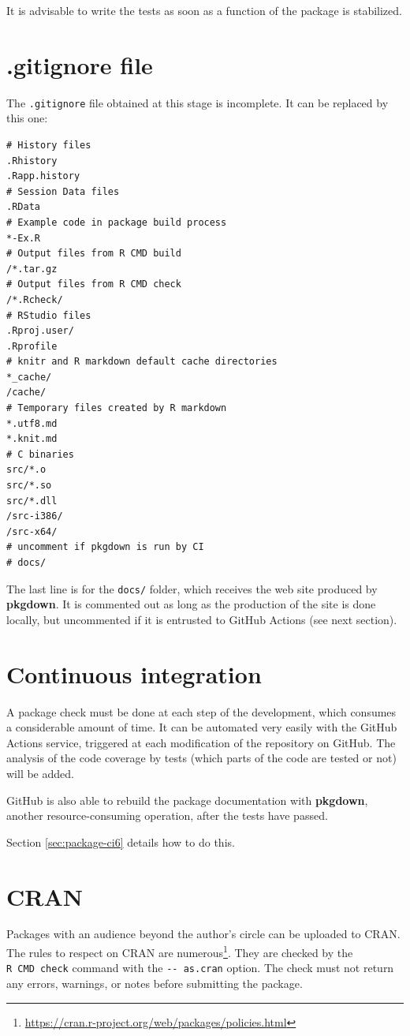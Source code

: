 \documentclass[
  12pt,
  american,
  a4paper,
  extrafontsizes,onecolumn,openright
  ]{memoir}
\begin{document}
It is advisable to write the tests as soon as a function of the package is stabilized.

\section{.gitignore file}\label{gitignore-file}

The \texttt{.gitignore} file obtained at this stage is incomplete.
It can be replaced by this one:

\begin{verbatim}
# History files
.Rhistory
.Rapp.history
# Session Data files
.RData
# Example code in package build process
*-Ex.R
# Output files from R CMD build
/*.tar.gz
# Output files from R CMD check
/*.Rcheck/
# RStudio files
.Rproj.user/
.Rprofile
# knitr and R markdown default cache directories
*_cache/
/cache/
# Temporary files created by R markdown
*.utf8.md
*.knit.md
# C binaries
src/*.o
src/*.so
src/*.dll
/src-i386/
/src-x64/
# uncomment if pkgdown is run by CI
# docs/
\end{verbatim}

The last line is for the \texttt{docs/} folder, which receives the web site produced by \textbf{pkgdown}.
It is commented out as long as the production of the site is done locally, but uncommented if it is entrusted to GitHub Actions (see next section).

\section{Continuous integration}\label{sec:package-ci5}

A package check must be done at each step of the development, which consumes a considerable amount of time.
It can be automated very easily with the GitHub Actions service, triggered at each modification of the repository on GitHub.
The analysis of the code coverage by tests (which parts of the code are tested or not) will be added.

GitHub is also able to rebuild the package documentation with \textbf{pkgdown}, another resource-consuming operation, after the tests have passed.

Section \ref{sec:package-ci6} details how to do this.

\section{CRAN}\label{sec:package-cran}

Packages with an audience beyond the author's circle can be uploaded to CRAN.
The rules to respect on CRAN are numerous\footnote{\url{https://cran.r-project.org/web/packages/policies.html}}. They are checked by the \texttt{R\ CMD\ check} command with the \texttt{-\/-\ as.cran} option.
The check must not return any errors, warnings, or notes before submitting the package.
\end{document}
